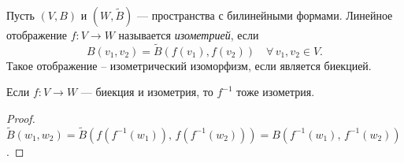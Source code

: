 \begin{definition}[Изометрия]
    Пусть $(V, B)$ и $(W, \widetilde{B})$ --- пространства с билинейными формами. Линейное отображение
    $f\colon V \to W$ называется \emph{изометрией}, если
    \[
        B(v_1, v_2) = \widetilde{B}(f(v_1), f(v_2)) \quad \forall\, v_1, v_2 \in V.
    \]
    Такое отображение -- изометрический  изоморфизм, если является биекцией.
\end{definition}


\begin{stmt}
    Если $f\colon V \to W$ --- биекция и изометрия, то $f^{-1}$ тоже изометрия.
    \begin{proof}
        $\widetilde{B}(w_1, w_2) = \widetilde{B}(f(f^{-1}(w_1)),\, f(f^{-1}(w_2))) = B(f^{-1}(w_1),\, f^{-1}(w_2))$.
    \end{proof}
\end{stmt}
